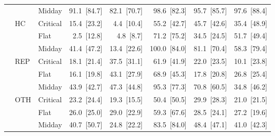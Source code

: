 \begin{tabular}{l l l r r r r r}
 &  & Midday & 91.1~{\color{seasoncol}\scriptsize[84.7]} & 82.1~{\color{seasoncol}\scriptsize[70.7]} & 98.6~{\color{seasoncol}\scriptsize[82.3]} & 95.7~{\color{seasoncol}\scriptsize[85.7]} & 97.6~{\color{seasoncol}\scriptsize[88.4]} \\
 & HC & Critical & 15.4~{\color{seasoncol}\scriptsize[23.2]} & 4.4~{\color{seasoncol}\scriptsize[10.4]} & 55.2~{\color{seasoncol}\scriptsize[42.7]} & 45.7~{\color{seasoncol}\scriptsize[42.6]} & 35.4~{\color{seasoncol}\scriptsize[48.9]} \\
 &  & Flat & 2.5~{\color{seasoncol}\scriptsize[12.8]} & 4.8~{\color{seasoncol}\scriptsize[8.7]} & 71.2~{\color{seasoncol}\scriptsize[75.2]} & 34.5~{\color{seasoncol}\scriptsize[24.5]} & 51.7~{\color{seasoncol}\scriptsize[49.4]} \\
 &  & Midday & 41.4~{\color{seasoncol}\scriptsize[47.2]} & 13.4~{\color{seasoncol}\scriptsize[22.6]} & 100.0~{\color{seasoncol}\scriptsize[84.0]} & 81.1~{\color{seasoncol}\scriptsize[70.4]} & 58.3~{\color{seasoncol}\scriptsize[79.4]} \\
 & REP & Critical & 18.1~{\color{seasoncol}\scriptsize[21.4]} & 37.5~{\color{seasoncol}\scriptsize[31.1]} & 61.9~{\color{seasoncol}\scriptsize[41.9]} & 22.0~{\color{seasoncol}\scriptsize[23.5]} & 10.1~{\color{seasoncol}\scriptsize[23.8]} \\
 &  & Flat & 16.1~{\color{seasoncol}\scriptsize[19.8]} & 43.1~{\color{seasoncol}\scriptsize[27.9]} & 68.9~{\color{seasoncol}\scriptsize[45.3]} & 17.8~{\color{seasoncol}\scriptsize[20.8]} & 26.8~{\color{seasoncol}\scriptsize[25.4]} \\
 &  & Midday & 43.9~{\color{seasoncol}\scriptsize[42.7]} & 47.3~{\color{seasoncol}\scriptsize[44.8]} & 95.3~{\color{seasoncol}\scriptsize[77.3]} & 70.8~{\color{seasoncol}\scriptsize[60.5]} & 34.8~{\color{seasoncol}\scriptsize[46.2]} \\
 & OTH & Critical & 23.2~{\color{seasoncol}\scriptsize[24.4]} & 19.3~{\color{seasoncol}\scriptsize[15.5]} & 50.4~{\color{seasoncol}\scriptsize[50.5]} & 29.9~{\color{seasoncol}\scriptsize[28.3]} & 21.0~{\color{seasoncol}\scriptsize[21.5]} \\
 &  & Flat & 26.0~{\color{seasoncol}\scriptsize[25.0]} & 29.0~{\color{seasoncol}\scriptsize[22.9]} & 59.3~{\color{seasoncol}\scriptsize[67.6]} & 28.5~{\color{seasoncol}\scriptsize[24.1]} & 27.2~{\color{seasoncol}\scriptsize[19.6]} \\
 &  & Midday & 40.7~{\color{seasoncol}\scriptsize[50.7]} & 24.8~{\color{seasoncol}\scriptsize[22.2]} & 83.5~{\color{seasoncol}\scriptsize[84.0]} & 48.4~{\color{seasoncol}\scriptsize[47.1]} & 41.0~{\color{seasoncol}\scriptsize[42.3]} \\
\bottomrule
\end{tabular}
